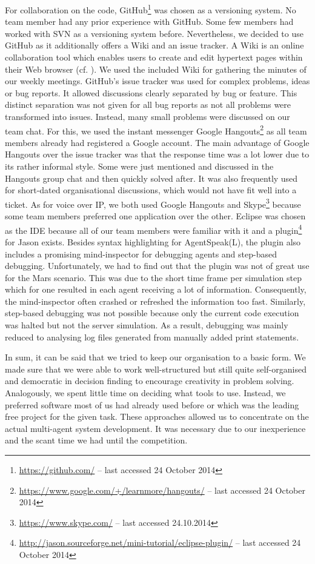 For collaboration on the code, GitHub\footnote{\url{https://github.com/} -- last accessed 24 October 2014} was chosen as a versioning system.
No team member had any prior experience with GitHub.
Some few members had worked with SVN as a versioning system before.
Nevertheless, we decided to use GitHub as it additionally offers a Wiki and an issue tracker.
A Wiki is an online collaboration tool which enables users to create and edit hypertext pages within their Web browser (cf. \cite{leuf_wiki_2001}).
We used the included Wiki for gathering the minutes of our weekly meetings.
GitHub's issue tracker was used for complex problems, ideas or bug reports.
It allowed discussions clearly separated by bug or feature.
This distinct separation was not given for all bug reports as not all problems were transformed into issues.
Instead, many small problems were discussed on our team chat.
For this, we used the instant messenger Google Hangouts\footnote{\url{https://www.google.com/+/learnmore/hangouts/} -- last accessed 24 October 2014} as all team members already had registered a Google account.
The main advantage of Google Hangouts over the issue tracker was that the response time was a lot lower due to its rather informal style.
Some were just mentioned and discussed in the Hangouts group chat and then quickly solved after.
It was also frequently used for short-dated organisational discussions, which would not have fit well into a ticket.
As for voice over IP, we both used Google Hangouts and Skype\footnote{\url{https://www.skype.com/} -- last accessed 24.10.2014} because some team members preferred one application over the other.
Eclipse was chosen as the IDE because all of our team members were familiar with it and a plugin\footnote{\url{http://jason.sourceforge.net/mini-tutorial/eclipse-plugin/} -- last accessed 24 October 2014} for Jason exists.
Besides syntax highlighting for AgentSpeak(L), the plugin also includes a promising mind-inspector for debugging agents and step-based debugging.
Unfortunately, we had to find out that the plugin was not of great use for the Mars scenario.
This was due to the short time frame per simulation step which for one resulted in each agent receiving a lot of information.
Consequently, the mind-inspector often crashed or refreshed the information too fast.
Similarly, step-based debugging was not possible because only the current code execution was halted but not the server simulation.
As a result, debugging was mainly reduced to analysing log files generated from manually added print statements.

In sum, it can be said that we tried to keep our organisation to a basic form.
We made sure that we were able to work well-structured but still quite self-organised and democratic in decision finding to encourage creativity in problem solving.
Analogously, we spent little time on deciding what tools to use.
Instead, we preferred software most of us had already used before or which was the leading free project for the given task.
These approaches allowed us to concentrate on the actual multi-agent system development.
It was necessary due to our inexperience and the scant time we had until the competition.
